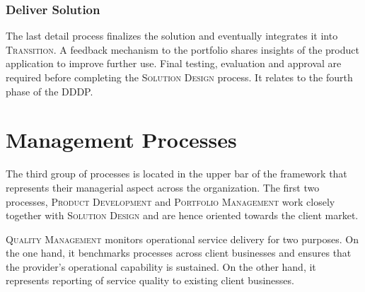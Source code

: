 	\subsubsection{Deliver Solution}
	
	The last detail process finalizes the solution and eventually integrates it into \textsc{Transition}. A feedback mechanism to the portfolio shares insights of the product application to improve further use. Final testing, evaluation and approval are required before completing the \textsc{Solution Design} process. It relates to the fourth phase of the \acrshort{DDDP}.
	
	
	
	
	
	
	
	
	
	
	
	
	
	
	
	\section{Management Processes}
	
	The third group of processes is located in the upper bar of the framework that represents their managerial aspect across the organization. The first two processes, \textsc{Product Development} and \textsc{Portfolio Management} work closely together with \textsc{Solution Design} and are hence oriented towards the client market. 
	
	\textsc{Quality Management} monitors operational service delivery for two purposes. On the one hand, it benchmarks processes across client businesses and ensures that the provider's operational capability is sustained. On the other hand, it represents reporting of service quality to existing client businesses.
	
